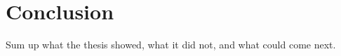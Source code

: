 \chapter{Conclusion}
\label{ch:conclusion}

Sum up what the thesis showed, what it did not, and what could come next.
